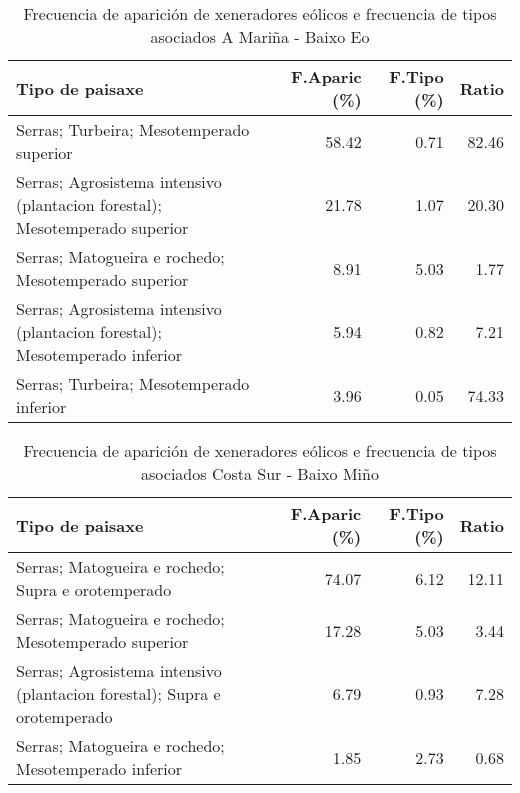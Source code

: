 \begin{table}[p]
\centering
\caption{Frecuencia de aparición de xeneradores eólicos e frecuencia de tipos asociados A Mariña - Baixo Eo} 
\label{veolico2}
\begin{tabular}{lrrr}
  \hline
Tipo de paisaxe & F.Aparic (\%) & F.Tipo (\%) & Ratio \\ 
  \hline
Serras; Turbeira; Mesotemperado superior & 58.42 & 0.71 & 82.46 \\ 
  Serras; Agrosistema intensivo (plantacion forestal); Mesotemperado superior & 21.78 & 1.07 & 20.30 \\ 
  Serras; Matogueira e rochedo; Mesotemperado superior & 8.91 & 5.03 & 1.77 \\ 
  Serras; Agrosistema intensivo (plantacion forestal); Mesotemperado inferior & 5.94 & 0.82 & 7.21 \\ 
  Serras; Turbeira; Mesotemperado inferior & 3.96 & 0.05 & 74.33 \\ 
   \hline
\end{tabular}
\end{table}
\begin{table}[p]
\centering
\caption{Frecuencia de aparición de xeneradores eólicos e frecuencia de tipos asociados Costa Sur - Baixo Miño} 
\label{veolico3}
\begin{tabular}{lrrr}
  \hline
Tipo de paisaxe & F.Aparic (\%) & F.Tipo (\%) & Ratio \\ 
  \hline
Serras; Matogueira e rochedo; Supra e orotemperado & 74.07 & 6.12 & 12.11 \\ 
  Serras; Matogueira e rochedo; Mesotemperado superior & 17.28 & 5.03 & 3.44 \\ 
  Serras; Agrosistema intensivo (plantacion forestal); Supra e orotemperado & 6.79 & 0.93 & 7.28 \\ 
  Serras; Matogueira e rochedo; Mesotemperado inferior & 1.85 & 2.73 & 0.68 \\ 
   \hline
\end{tabular}
\end{table}
